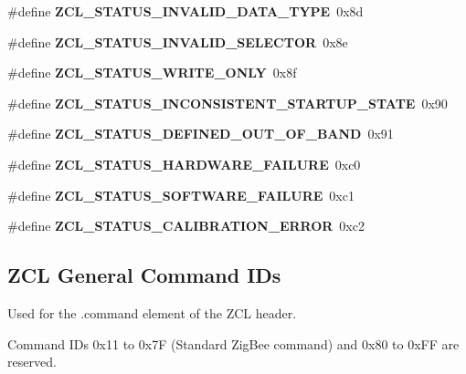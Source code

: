 \begin{DoxyCompactItemize}
\#define {\bfseries Z\+C\+L\+\_\+\+S\+T\+A\+T\+U\+S\+\_\+\+I\+N\+V\+A\+L\+I\+D\+\_\+\+D\+A\+T\+A\+\_\+\+T\+Y\+PE}~0x8d
\item 
\mbox{\label{group__zcl_ga28907da0ee4264d19ff6c2c354b7c50b}} 
\#define {\bfseries Z\+C\+L\+\_\+\+S\+T\+A\+T\+U\+S\+\_\+\+I\+N\+V\+A\+L\+I\+D\+\_\+\+S\+E\+L\+E\+C\+T\+OR}~0x8e
\item 
\mbox{\label{group__zcl_gac7386b6a4777fb92dbbf86a5b014807d}} 
\#define {\bfseries Z\+C\+L\+\_\+\+S\+T\+A\+T\+U\+S\+\_\+\+W\+R\+I\+T\+E\+\_\+\+O\+N\+LY}~0x8f
\item 
\mbox{\label{group__zcl_gaee6e14129b1399a33c1a29dc7b912396}} 
\#define {\bfseries Z\+C\+L\+\_\+\+S\+T\+A\+T\+U\+S\+\_\+\+I\+N\+C\+O\+N\+S\+I\+S\+T\+E\+N\+T\+\_\+\+S\+T\+A\+R\+T\+U\+P\+\_\+\+S\+T\+A\+TE}~0x90
\item 
\mbox{\label{group__zcl_ga1361f5efe6f70e39fbb7c91174d94076}} 
\#define {\bfseries Z\+C\+L\+\_\+\+S\+T\+A\+T\+U\+S\+\_\+\+D\+E\+F\+I\+N\+E\+D\+\_\+\+O\+U\+T\+\_\+\+O\+F\+\_\+\+B\+A\+ND}~0x91
\item 
\mbox{\label{group__zcl_ga34e6f4bfd5b2539f9644fcbd1449724f}} 
\#define {\bfseries Z\+C\+L\+\_\+\+S\+T\+A\+T\+U\+S\+\_\+\+H\+A\+R\+D\+W\+A\+R\+E\+\_\+\+F\+A\+I\+L\+U\+RE}~0xc0
\item 
\mbox{\label{group__zcl_ga0a3806ae2bf91be66123013afd4ccdec}} 
\#define {\bfseries Z\+C\+L\+\_\+\+S\+T\+A\+T\+U\+S\+\_\+\+S\+O\+F\+T\+W\+A\+R\+E\+\_\+\+F\+A\+I\+L\+U\+RE}~0xc1
\item 
\mbox{\label{group__zcl_ga64a57931e9c19abbd33a2edb4acefb8c}} 
\#define {\bfseries Z\+C\+L\+\_\+\+S\+T\+A\+T\+U\+S\+\_\+\+C\+A\+L\+I\+B\+R\+A\+T\+I\+O\+N\+\_\+\+E\+R\+R\+OR}~0xc2
\end{DoxyCompactItemize}
\subsection*{Z\+CL General Command I\+Ds}
\label{_amgrp27eea603d65ab29a11d175579fcb3efa}%
Used for the .command element of the Z\+CL header.

Command I\+Ds 0x11 to 0x7F (Standard Zig\+Bee command) and 0x80 to 0x\+FF are reserved.

